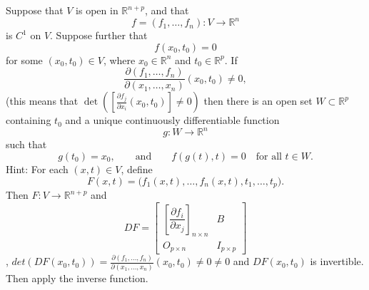 \begin{problem}

Suppose that \(V\) is open in \(\mathbb{R}^{n+p}\), and that
\[
f=(f_1,\dots,f_n):V\to\mathbb{R}^n
\]
is \(C^1\) on \(V\). Suppose further that
\[
f(x_0,t_0)=0
\]
for some \((x_0,t_0)\in V\), where \(x_0\in\mathbb{R}^n\) and \(t_0\in\mathbb{R}^p\). If
\[
\frac{\partial(f_1,\dots,f_n)}{\partial(x_1,\dots,x_n)}(x_0,t_0)\neq 0,
\] (this means that $\det( [\frac{\partial f_j}{\partial x_i} (x_0,t_0) ]\neq 0 )$
then there is an open set \(W\subset\mathbb{R}^p\) containing \(t_0\) and a unique continuously differentiable function
\[
g:W\to\mathbb{R}^n
\]
such that
\[
g(t_0)=x_0,
\qquad\text{and}\qquad
f(g(t),t)=0
\quad\text{for all } t\in W.
\]
Hint: For each \((x,t)\in V\), define
\[
F(x,t)=\bigl(f_1(x,t),\dots,f_n(x,t),t_1,\dots,t_p\bigr).
\]
Then \( F:V\to\mathbb{R}^{n+p}\) and
\[
D F=
\begin{bmatrix}
\left[\dfrac{\partial f_i}{\partial x_j}\right]_{n\times n} & B\\[1ex]
O_{p\times n} & I_{p\times p}
\end{bmatrix}
\], $det(D F (x_0,t_0))= \frac{\partial(f_1,\dots,f_n)}{\partial(x_1,\dots,x_n)}(x_0,t_0)\neq 0 \neq 0$ and $D F (x_0,t_0)$ is invertible. Then apply the inverse function.

\end{problem}

